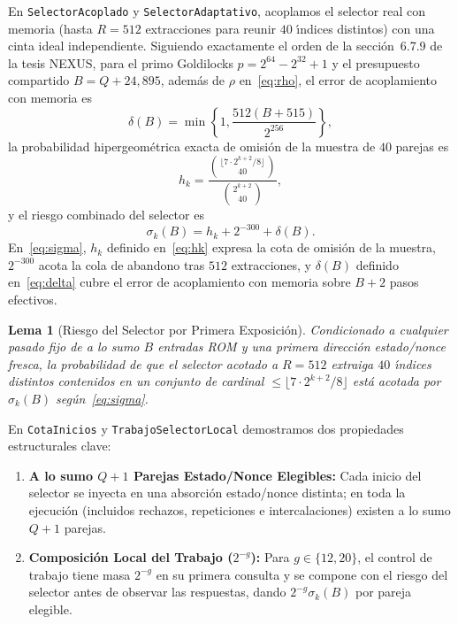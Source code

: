 \documentclass[conference]{IEEEtran}
\newtheorem{lemma}{Lema}
\theoremstyle{definition}
\begin{document}
En \texttt{SelectorAcoplado} y \texttt{SelectorAdaptativo}, acoplamos el selector real con memoria (hasta $R = 512$ extracciones para reunir $40$ \'{\i}ndices distintos) con una cinta ideal independiente. Siguiendo exactamente el orden de la secci\'{o}n~6.7.9 de la tesis NEXUS, para el primo Goldilocks $p = 2^{64} - 2^{32} + 1$ y el presupuesto compartido $B = Q + 24{,}895$, adem\'{a}s de $\rho$ en~\eqref{eq:rho}, el error de acoplamiento con memoria es
\begin{equation}
\label{eq:delta}
\delta(B) = \min\left\{1, \frac{512(B + 515)}{2^{256}}\right\},
\end{equation}
la probabilidad hipergeom\'{e}trica exacta de omisi\'{o}n de la muestra de $40$ parejas es
\begin{equation}
\label{eq:hk}
h_k = \frac{\binom{\lfloor 7 \cdot 2^{k+2} / 8 \rfloor}{40}}{\binom{2^{k+2}}{40}},
\end{equation}
y el riesgo combinado del selector es
\begin{equation}
\label{eq:sigma}
\sigma_k(B) = h_k + 2^{-300} + \delta(B).
\end{equation}
En~\eqref{eq:sigma}, $h_k$ definido en~\eqref{eq:hk} expresa la cota de omisi\'{o}n de la muestra, $2^{-300}$ acota la cola de abandono tras $512$ extracciones, y $\delta(B)$ definido en~\eqref{eq:delta} cubre el error de acoplamiento con memoria sobre $B + 2$ pasos efectivos.

\begin{lemma}[Riesgo del Selector por Primera Exposici\'{o}n]
\label{lem:selector}
Condicionado a cualquier pasado fijo de a lo sumo $B$ entradas ROM y una primera direcci\'{o}n estado/nonce fresca, la probabilidad de que el selector acotado a $R = 512$ extraiga $40$ \'{\i}ndices distintos contenidos en un conjunto de cardinal $\le \lfloor 7 \cdot 2^{k+2} / 8 \rfloor$ est\'{a} acotada por $\sigma_k(B)$ seg\'{u}n~\eqref{eq:sigma}.
\end{lemma}

En \texttt{CotaInicios} y \texttt{TrabajoSelectorLocal} demostramos dos propiedades estructurales clave:
\begin{enumerate}
    \setlength{\itemsep}{2pt}
    \item \textbf{A lo sumo $Q + 1$ Parejas Estado/Nonce Elegibles:} Cada inicio del selector se inyecta en una absorci\'{o}n estado/nonce distinta; en toda la ejecuci\'{o}n (incluidos rechazos, repeticiones e intercalaciones) existen a lo sumo $Q + 1$ parejas.
    \item \textbf{Composici\'{o}n Local del Trabajo ($2^{-g}$):} Para $g \in \{12, 20\}$, el control de trabajo tiene masa $2^{-g}$ en su primera consulta y se compone con el riesgo del selector antes de observar las respuestas, dando $2^{-g}\sigma_k(B)$ por pareja elegible.
\end{enumerate}
\end{document}
